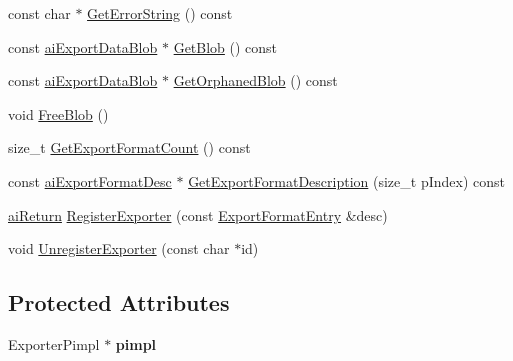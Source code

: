 \begin{DoxyCompactItemize}
\item 
const char $\ast$ \hyperlink{class_assimp_1_1_exporter_ad5dae590c3f2b8aa5fc3e2b26f7886e3}{Get\-Error\-String} () const 
\item 
const \hyperlink{structai_export_data_blob}{ai\-Export\-Data\-Blob} $\ast$ \hyperlink{class_assimp_1_1_exporter_aaee439cf6810d14eded4a12b9bc63e0b}{Get\-Blob} () const 
\item 
const \hyperlink{structai_export_data_blob}{ai\-Export\-Data\-Blob} $\ast$ \hyperlink{class_assimp_1_1_exporter_a75291079fa484c5769b36a80b1b393a5}{Get\-Orphaned\-Blob} () const 
\item 
void \hyperlink{class_assimp_1_1_exporter_a8200b618c21c272c839c37060a871d48}{Free\-Blob} ()
\item 
size\-\_\-t \hyperlink{class_assimp_1_1_exporter_abfada264486a34c52ae43a762d5cbf01}{Get\-Export\-Format\-Count} () const 
\item 
const \hyperlink{structai_export_format_desc}{ai\-Export\-Format\-Desc} $\ast$ \hyperlink{class_assimp_1_1_exporter_a724e2a029ec38d7252f7a7169c9eb7e4}{Get\-Export\-Format\-Description} (size\-\_\-t p\-Index) const 
\item 
\hyperlink{types_8h_a1f78dfb65090aa930cabb984c8abe711}{ai\-Return} \hyperlink{class_assimp_1_1_exporter_ae65025d7c5a06a0c3e8655585f87e1c4}{Register\-Exporter} (const \hyperlink{struct_assimp_1_1_exporter_1_1_export_format_entry}{Export\-Format\-Entry} \&desc)
\item 
void \hyperlink{class_assimp_1_1_exporter_afa5956ce18138b90396c505468d1e52b}{Unregister\-Exporter} (const char $\ast$id)
\end{DoxyCompactItemize}
\subsection*{Protected Attributes}
\begin{DoxyCompactItemize}
\item 
\hypertarget{class_assimp_1_1_exporter_a75bc178ae29edc192e1c1935c31c42b2}{Exporter\-Pimpl $\ast$ {\bfseries pimpl}}\label{class_assimp_1_1_exporter_a75bc178ae29edc192e1c1935c31c42b2}

\end{DoxyCompactItemize}


